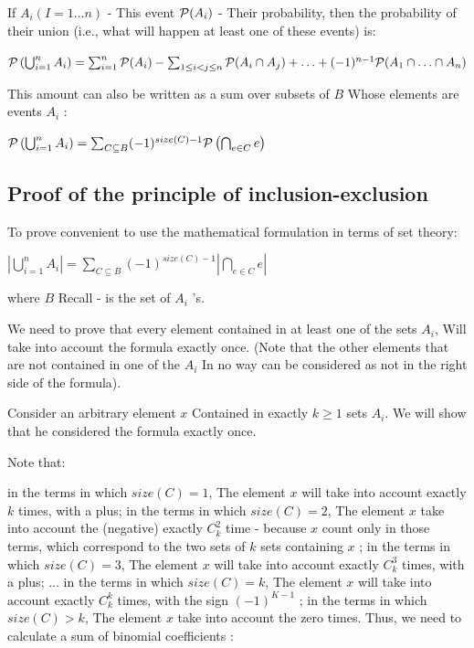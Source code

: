 If $A_i$$(I = 1 \ldots n)$ - This event ${\cal P} (A_i)$ - Their probability, then the probability of their union (i.e., what will happen at least one of these events) is:

${\cal P}\left(\bigcup_{i=1}^{n}A_{i}\right)=\sum_{i=1}^{n}{\cal P}(A_{i})-\sum_{1\leq i<j\leq n}{\cal P}(A_{i}\cap A_{j})+\ldots+(-1)^{n-1}{\cal P}(A_{1}\cap\ldots\cap A_{n})$

This amount can also be written as a sum over subsets of $B$ Whose elements are events $A_i$ :

${\cal P}\left(\bigcup_{i=1}^{n}A_{i}\right)=\sum_{C\subseteq B}(-1)^{size(C)-1}{\cal P}\left(\bigcap_{e\in C}e\right)$

\subsection{ Proof of the principle of inclusion-exclusion }

To prove convenient to use the mathematical formulation in terms of set theory:

$\left|\bigcup_{i=1}^{n}A_{i}\right|=\sum_{C\subseteq B}(-1)^{size(C)-1}\left|\bigcap_{e\in C}e\right|$

where $B$ Recall - is the set of $A_i$ 's.

We need to prove that every element contained in at least one of the sets $A_i$, Will take into account the formula exactly once. (Note that the other elements that are not contained in one of the $A_i$ In no way can be considered as not in the right side of the formula).

Consider an arbitrary element $x$ Contained in exactly $k \ge 1$ sets $A_i$. We will show that he considered the formula exactly once.

Note that:

in the terms in which $size (C) = 1$, The element $x$ will take into account exactly $k$ times, with a plus;
in the terms in which $size (C) = 2$, The element $x$ take into account the (negative) exactly $C_k ^ 2$ time - because $x$ count only in those terms, which correspond to the two sets of $k$ sets containing $x$ ;
in the terms in which $size (C) = 3$, The element $x$ will take into account exactly $C_k ^ 3$ times, with a plus;
$\ldots$
in the terms in which $size (C) = k$, The element $x$ will take into account exactly $C_k ^ k$ times, with the sign $(-1) ^ {K-1}$ ;
in the terms in which $size (C)> k$, The element $x$ take into account the zero times.
Thus, we need to calculate a sum of binomial coefficients :

